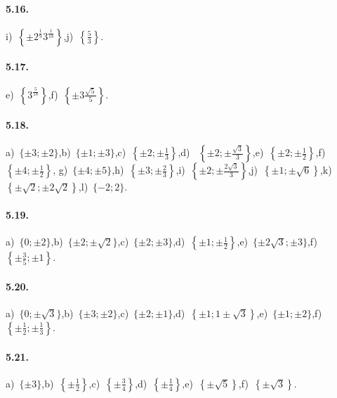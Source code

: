 \paragraph{5.16.} i)~$\left\{\pm 2^{\frac 1 9}3^{\frac 1{18}}\right\}$,\quad j)~$\left\{\frac 5 3\right\}$.

\paragraph{5.17.} e)~$\left\{3^{\frac 5{18}}\right\}$,\quad f)~$\left\{\pm 3\frac{\sqrt 5} 5\right\}$.

\paragraph{5.18.} a)~$\{\pm 3;\pm 2\}$,\quad b)~$\{\pm 1; \pm 3\}$,\quad c)~$\left\{\pm 2;\pm \frac 1 3\right\}$,\quad d)~ $\left\{\pm 2;\pm \frac{\sqrt 3} 3\right\}$,\quad e)~$\left\{\pm 2;\pm \frac 1 2\right\}$,\quad f)~$\left\{\pm 4;\pm \frac 1 2\right\}$,\quad
g)~$\{\pm 4;\pm 5\}$,\quad h)~$\left\{\pm 3;\pm \frac 2 3\right\}$,\quad i)~$\left\{\pm 2;\pm \frac{2\sqrt 3} 3\right\}$,\quad j)~$\left\{\pm 1;\pm \sqrt 6\right\}$,\quad k)~$\left\{\pm \sqrt 2;\pm 2\sqrt 2\right\}$,\quad l)~$\{-2;2\}$.

\paragraph{5.19.} a)~$\{0; \pm 2\}$,\quad b)~$\{\pm 2; \pm\sqrt{2}\}$,\quad c)~$\{\pm 2; \pm 3\}$,\quad d)~$\left\{\pm 1; \pm\frac{1}{2}\right\}$,\quad e)~$\{\pm 2\sqrt{3}; \pm 3\}$,\quad f)~$\left\{\pm \frac 3 5; \pm 1\right\}$.

\paragraph{5.20.} a)~$\{0; \pm \sqrt{3}\}$,\quad b)~$\{\pm 3; \pm{2}\}$,\quad c)~$\{\pm 2; \pm 1\}$,\quad d)~$\left\{\pm 1; 1\pm\sqrt{3}\right\}$,\quad e)~$\{\pm 1; \pm 2\}$,\quad f)~$\left\{\pm \frac 1 2; \pm \frac{1}{3}\right\}$.

\paragraph{5.21.} a)~$\{\pm 3\}$,\quad b)~$\left\{\pm \frac 1 2\right\}$,\quad c)~$\left\{\pm \frac 3 4\right\}$,\quad d)~$\left\{\pm \frac 1 4\right\}$,\quad e)~$\left\{\pm \sqrt 5\right\}$,\quad f)~$\left\{\pm \sqrt 3\right\}$.

